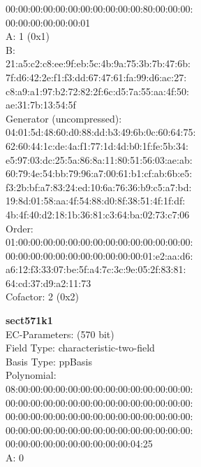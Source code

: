     00:00:00:00:00:00:00:00:00:00:00:80:00:00:00:\\
    00:00:00:00:00:00:01\\
A:    1 (0x1)\\
B:   \\
    21:a5:c2:c8:ee:9f:eb:5c:4b:9a:75:3b:7b:47:6b:\\
    7f:d6:42:2e:f1:f3:dd:67:47:61:fa:99:d6:ac:27:\\
    c8:a9:a1:97:b2:72:82:2f:6c:d5:7a:55:aa:4f:50:\\
    ae:31:7b:13:54:5f\\
Generator (uncompressed):\\
    04:01:5d:48:60:d0:88:dd:b3:49:6b:0c:60:64:75:\\
    62:60:44:1c:de:4a:f1:77:1d:4d:b0:1f:fe:5b:34:\\
    e5:97:03:dc:25:5a:86:8a:11:80:51:56:03:ae:ab:\\
    60:79:4e:54:bb:79:96:a7:00:61:b1:cf:ab:6b:e5:\\
    f3:2b:bf:a7:83:24:ed:10:6a:76:36:b9:c5:a7:bd:\\
    19:8d:01:58:aa:4f:54:88:d0:8f:38:51:4f:1f:df:\\
    4b:4f:40:d2:18:1b:36:81:c3:64:ba:02:73:c7:06\\
Order: \\
    01:00:00:00:00:00:00:00:00:00:00:00:00:00:00:\\
    00:00:00:00:00:00:00:00:00:00:00:01:e2:aa:d6:\\
    a6:12:f3:33:07:be:5f:a4:7c:3c:9e:05:2f:83:81:\\
    64:cd:37:d9:a2:11:73\\
Cofactor:  2 (0x2)\\
\item \textbf{ sect571k1 }\\
EC-Parameters: (570 bit)\\
Field Type: characteristic-two-field\\
Basis Type: ppBasis\\
Polynomial:\\
    08:00:00:00:00:00:00:00:00:00:00:00:00:00:00:\\
    00:00:00:00:00:00:00:00:00:00:00:00:00:00:00:\\
    00:00:00:00:00:00:00:00:00:00:00:00:00:00:00:\\
    00:00:00:00:00:00:00:00:00:00:00:00:00:00:00:\\
    00:00:00:00:00:00:00:00:00:00:04:25\\
A:    0\\

